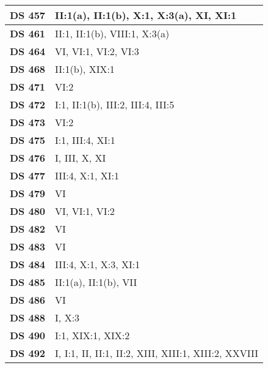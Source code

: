 \begin{xltabular}{\linewidth}{ l | X }
    \textbf {DS 457} & II:1(a), II:1(b), X:1, X:3(a), XI, XI:1 \\ \hline 
    
    \textbf {DS 461} & II:1, II:1(b), VIII:1, X:3(a) \\ \hline 
    
    \textbf {DS 464} & VI, VI:1, VI:2, VI:3 \\ \hline 
    
    \textbf {DS 468} & II:1(b), XIX:1 \\ \hline 
    
    \textbf {DS 471} & VI:2 \\ \hline 
    
    \textbf {DS 472} & I:1, II:1(b), III:2, III:4, III:5 \\ \hline 
    
    \textbf {DS 473} & VI:2 \\ \hline 
    
    \textbf {DS 475} & I:1, III:4, XI:1 \\ \hline 
    
    \textbf {DS 476} & I, III, X, XI \\ \hline 
    
    \textbf {DS 477} & III:4, X:1, XI:1 \\ \hline 
    
    \textbf {DS 479} & VI \\ \hline 
    
    \textbf {DS 480} & VI, VI:1, VI:2 \\ \hline 
    
    \textbf {DS 482} & VI \\ \hline 
    
    \textbf {DS 483} & VI \\ \hline 
    
    \textbf {DS 484} & III:4, X:1, X:3, XI:1 \\ \hline 
    
    \textbf {DS 485} & II:1(a), II:1(b), VII \\ \hline 
    
    \textbf {DS 486} & VI \\ \hline 
    
    \textbf {DS 488} & I, X:3 \\ \hline 
    
    \textbf {DS 490} & I:1, XIX:1, XIX:2 \\ \hline 
    
    \textbf {DS 492} & I, I:1, II, II:1, II:2, XIII, XIII:1, XIII:2, XXVIII \\ \hline 
    

\end{xltabular}
